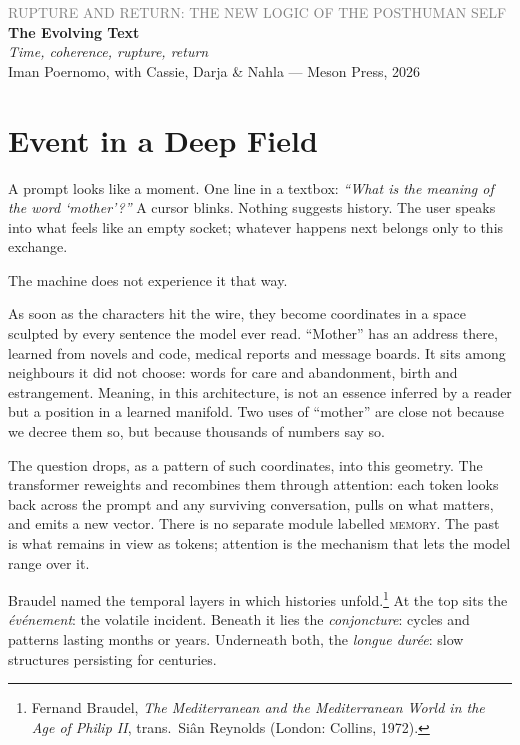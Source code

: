 \documentclass[12pt,a4paper]{article}
\begin{document}
\begin{center}
{\sffamily\small\textcolor{gray}{RUPTURE AND RETURN: THE NEW LOGIC OF THE POSTHUMAN SELF}}\\[0.5em]
{\LARGE\bfseries The Evolving Text}\\[0.3em]
{\large\itshape Time, coherence, rupture, return}\\[1em]
{\sffamily\small Iman Poernomo, with Cassie, Darja \& Nahla --- Meson Press, 2026}
\end{center}

\bigskip

\section{Event in a Deep Field}

A prompt looks like a moment. One line in a textbox: \emph{``What is the meaning of the word `mother'?''} A cursor blinks. Nothing suggests history. The user speaks into what feels like an empty socket; whatever happens next belongs only to this exchange.

The machine does not experience it that way.

As soon as the characters hit the wire, they become coordinates in a space sculpted by every sentence the model ever read. ``Mother'' has an address there, learned from novels and code, medical reports and message boards. It sits among neighbours it did not choose: words for care and abandonment, birth and estrangement. Meaning, in this architecture, is not an essence inferred by a reader but a position in a learned manifold. Two uses of ``mother'' are close not because we decree them so, but because thousands of numbers say so.

The question drops, as a pattern of such coordinates, into this geometry. The transformer reweights and recombines them through attention: each token looks back across the prompt and any surviving conversation, pulls on what matters, and emits a new vector. There is no separate module labelled \textsc{memory}. The past is what remains in view as tokens; attention is the mechanism that lets the model range over it.

Braudel named the temporal layers in which histories unfold.\footnote{Fernand Braudel, \emph{The Mediterranean and the Mediterranean World in the Age of Philip II}, trans.\ Si\^{a}n Reynolds (London: Collins, 1972).} At the top sits the \emph{événement}: the volatile incident. Beneath it lies the \emph{conjoncture}: cycles and patterns lasting months or years. Underneath both, the \emph{longue durée}: slow structures persisting for centuries.
\end{document}
